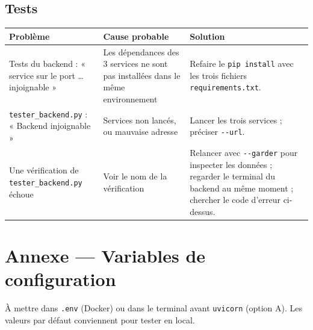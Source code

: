 \documentclass[11pt,a4paper]{article}
\begin{document}
\subsection{Tests}
\begin{center}
\small
\begin{longtable}{L{4.6cm}L{4cm}L{6.4cm}}
\toprule
\textbf{Problème} & \textbf{Cause probable} & \textbf{Solution} \\
\midrule
\endhead
Tests du backend : « service sur le port … injoignable » & Les dépendances des 3 services ne sont pas installées dans le même environnement & Refaire le \texttt{pip install} avec les trois fichiers \texttt{requirements.txt}. \\
\texttt{tester\_backend.py} : « Backend injoignable » & Services non lancés, ou mauvaise adresse & Lancer les trois services ; préciser \texttt{-{}-url}. \\
Une vérification de \texttt{tester\_backend.py} échoue & Voir le nom de la vérification & Relancer avec \texttt{-{}-garder} pour inspecter les données ; regarder le terminal du backend au même moment ; chercher le code d'erreur ci-dessus. \\
\bottomrule
\end{longtable}
\end{center}

\section{Annexe — Variables de configuration}

À mettre dans \texttt{.env} (Docker) ou dans le terminal avant \texttt{uvicorn} (option A). Les valeurs par défaut
conviennent pour tester en local.
\end{document}
